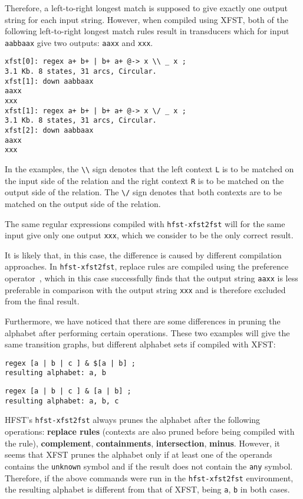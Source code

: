 \documentclass{llncs}
\begin{document}
Therefore, a left-to-right longest match is supposed to give exactly one output
string for each input string. However, when compiled using XFST, both of the following left-to-right
longest match rules result in transducers which for input \verb+aabbaax+ give two outputs: \verb+aaxx+ and \verb+xxx+.
\begin{verbatim}
xfst[0]: regex a+ b+ | b+ a+ @-> x \\ _ x ;
3.1 Kb. 8 states, 31 arcs, Circular.
xfst[1]: down aabbaax
aaxx
xxx
xfst[1]: regex a+ b+ | b+ a+ @-> x \/ _ x ;
3.1 Kb. 8 states, 31 arcs, Circular.
xfst[2]: down aabbaax
aaxx
xxx
\end{verbatim}

In the examples, the \verb+\\+ sign denotes that the left context \verb+L+ is to be
matched on the input side of the relation and the right context \verb+R+ is to
be matched on the output side of the relation. The \verb+\/+ sign denotes
that both contexts are to be matched on the output side of the relation.

The same regular expressions compiled with \verb+hfst-xfst2fst+ will for the same
input give only one output \verb+xxx+, which we consider to be the only correct
result.

It is likely that, in this case, the difference is caused by different compilation approaches.
In \verb+hfst-xfst2fst+, replace rules are compiled using the preference
operator~\cite{drobac/2012}, which in this case successfully finds that the output string
\verb+aaxx+ is less preferable in comparison with the output string \verb+xxx+ and 
is therefore excluded from the final result.

Furthermore, we have noticed that there are some differences in pruning the alphabet
after performing certain operations.
These two examples will give the same transition graphs, but different alphabet
sets if compiled with XFST:
\begin{verbatim}
regex [a | b | c ] & $[a | b] ;
resulting alphabet: a, b
\end{verbatim}
\begin{verbatim}
regex [a | b | c ] & [a | b] ;
resulting alphabet: a, b, c
\end{verbatim}

HFST's \verb+hfst-xfst2fst+ always prunes the alphabet after the following operations:
\textbf{replace rules} (contexts are also pruned before being compiled with the
rule), \textbf{complement}, \textbf{containments}, \textbf{intersection},
\textbf{minus}. However, it seems that XFST prunes the alphabet only if at
least one of the operands contains the \verb+unknown+ symbol and if the result does not
contain the \verb+any+ symbol. Therefore, if the above commands were run in the \verb+hfst-xfst2fst+
environment, the resulting alphabet is different from that of XFST,
being \verb+a+, \verb+b+ in both cases.
\end{document}

